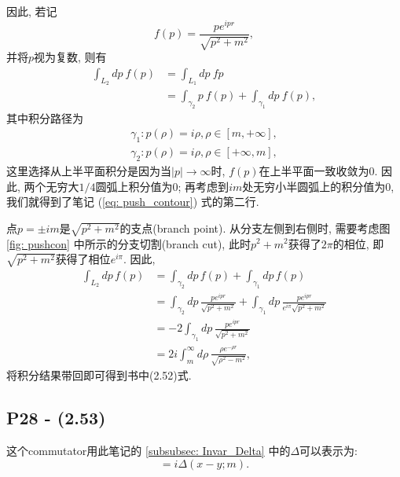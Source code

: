 \documentclass[10pt,b5paper,openany]{book}
\begin{document}
因此, 若记
\begin{equation}
  f(p) = \frac{pe^{ipr}}{\sqrt{p^2+m^2}}, 
\end{equation}
并将$p$视为复数, 则有
\begin{equation}\label{eq: push_contour}
  \begin{aligned}
    \int_{L_2}dp\ f(p) &= \int_{L_1}dp\ fp \\
    &= \int_{\gamma_2}p\ f(p) + \int_{\gamma_1}dp\ f(p), 
  \end{aligned}
\end{equation}
其中积分路径为
\begin{equation*}
  \begin{aligned}
    \gamma_1: p(\rho) = i\rho, \rho\in[m,+\infty], \\
    \gamma_2: p(\rho) = i\rho, \rho\in[+\infty,m],  
  \end{aligned}
\end{equation*}
这里选择从上半平面积分是因为当$|p|\to\infty$时, $f(p)$在上半平面一致收敛为0. 因此, 两个无穷大$1/4$圆弧上积分值为0; 再考虑到$im$处无穷小半圆弧上的积分值为0, 我们就得到了笔记 (\ref{eq: push_contour}) 式的第二行. 

点$p = \pm im$是$\sqrt{p^2+m^2}$的支点(branch point). 从分支左侧到右侧时, 需要考虑图 \ref{fig: pushcon} 中所示的分支切割(branch cut), 此时$p^2+m^2$获得了$2\pi$的相位, 即$\sqrt{p^2+m^2}$获得了相位$e^{i\pi}$. 因此, 
\begin{equation}
  \begin{aligned}
    \int_{L_2}dp\,f(p) &= \int_{\gamma_2}dp\,f(p) + \int_{\gamma_1}dp\,f(p)\\
    &= \int_{\gamma_2}dp\,\frac{pe^{ipr}}{\sqrt{p^2+m^2}}
    + \int_{\gamma_1}dp\,\frac{pe^{ipr}}{e^{i\pi}\sqrt{p^2+m^2}}\\
    &= -2\int_{\gamma_1}dp\,\frac{pe^{ipr}}{\sqrt{p^2+m^2}}\\
    &= 2i\int_{m}^{\infty}d\rho\,\frac{\rho e^{-\rho r}}{\sqrt{\rho^2-m^2}}, 
  \end{aligned}
\end{equation}
将积分结果带回即可得到书中(2.52)式. 

\subsection{P28 - (2.53)}

这个commutator用此笔记的 \ref{subsubsec: Invar_Delta} 中的$\Delta$可以表示为: 
\begin{equation}
  [\phi(x), \phi(y)] = i\Delta(x-y; m). 
\end{equation}
\end{document}
